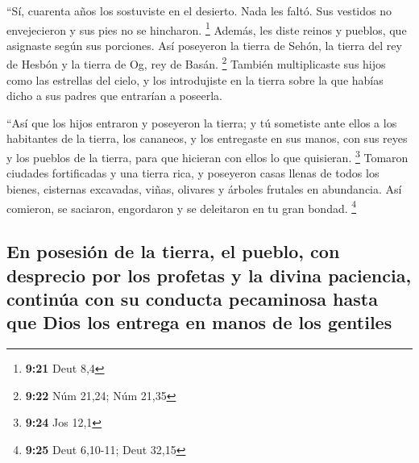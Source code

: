 \begin{paracol}{2}
 ``Sí, cuarenta años los sostuviste en el desierto. Nada
les faltó. Sus vestidos no envejecieron y sus pies no se hincharon.
\footnote{\textbf{9:21} Deut 8,4}  Además, les diste
reinos y pueblos, que asignaste según sus porciones. Así poseyeron la
tierra de Sehón, la tierra del rey de Hesbón y la tierra de Og, rey de
Basán. \footnote{\textbf{9:22} Núm 21,24; Núm 21,35} 
También multiplicaste sus hijos como las estrellas del cielo, y los
introdujiste en la tierra sobre la que habías dicho a sus padres que
entrarían a poseerla.

 ``Así que los hijos entraron y poseyeron la tierra; y tú
sometiste ante ellos a los habitantes de la tierra, los cananeos, y los
entregaste en sus manos, con sus reyes y los pueblos de la tierra, para
que hicieran con ellos lo que quisieran. \footnote{\textbf{9:24} Jos
  12,1}  Tomaron ciudades fortificadas y una tierra rica,
y poseyeron casas llenas de todos los bienes, cisternas excavadas,
viñas, olivares y árboles frutales en abundancia. Así comieron, se
saciaron, engordaron y se deleitaron en tu gran bondad. \footnote{\textbf{9:25}
  Deut 6,10-11; Deut 32,15}

\hypertarget{en-posesiuxf3n-de-la-tierra-el-pueblo-con-desprecio-por-los-profetas-y-la-divina-paciencia-continuxfaa-con-su-conducta-pecaminosa-hasta-que-dios-los-entrega-en-manos-de-los-gentiles}{%
\subsection{En posesión de la tierra, el pueblo, con desprecio por los
profetas y la divina paciencia, continúa con su conducta pecaminosa
hasta que Dios los entrega en manos de los
gentiles}\label{en-posesiuxf3n-de-la-tierra-el-pueblo-con-desprecio-por-los-profetas-y-la-divina-paciencia-continuxfaa-con-su-conducta-pecaminosa-hasta-que-dios-los-entrega-en-manos-de-los-gentiles}}


\end{paracol}
